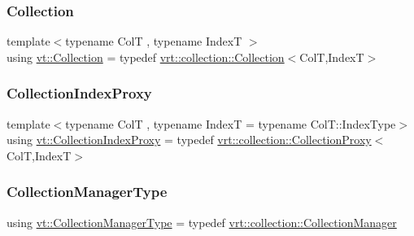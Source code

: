 \mbox{\label{namespacevt_ac72e048964e4bb536faaa8bc90f58db7}} 
\subsubsection{\texorpdfstring{Collection}{Collection}}
{\footnotesize\ttfamily template$<$typename ColT , typename IndexT $>$ \\
using \hyperlink{namespacevt_ac72e048964e4bb536faaa8bc90f58db7}{vt\+::\+Collection} = typedef \hyperlink{structvt_1_1vrt_1_1collection_1_1_collection}{vrt\+::collection\+::\+Collection}$<$ColT,IndexT$>$}

\mbox{\label{namespacevt_a2be17f5dafb626fe9f58d762b6aad2f0}} 
\subsubsection{\texorpdfstring{Collection\+Index\+Proxy}{CollectionIndexProxy}}
{\footnotesize\ttfamily template$<$typename ColT , typename IndexT  = typename Col\+T\+::\+Index\+Type$>$ \\
using \hyperlink{namespacevt_a2be17f5dafb626fe9f58d762b6aad2f0}{vt\+::\+Collection\+Index\+Proxy} = typedef \hyperlink{structvt_1_1vrt_1_1collection_1_1_collection_proxy}{vrt\+::collection\+::\+Collection\+Proxy}$<$ColT,IndexT$>$}

\mbox{\label{namespacevt_a290f7e8941f9f411b54cdb15b6cea107}} 
\subsubsection{\texorpdfstring{Collection\+Manager\+Type}{CollectionManagerType}}
{\footnotesize\ttfamily using \hyperlink{namespacevt_a290f7e8941f9f411b54cdb15b6cea107}{vt\+::\+Collection\+Manager\+Type} = typedef \hyperlink{structvt_1_1vrt_1_1collection_1_1_collection_manager}{vrt\+::collection\+::\+Collection\+Manager}}

\mbox{\label{namespacevt_ae7700e12f79c0fec16964aab84838428}} 
